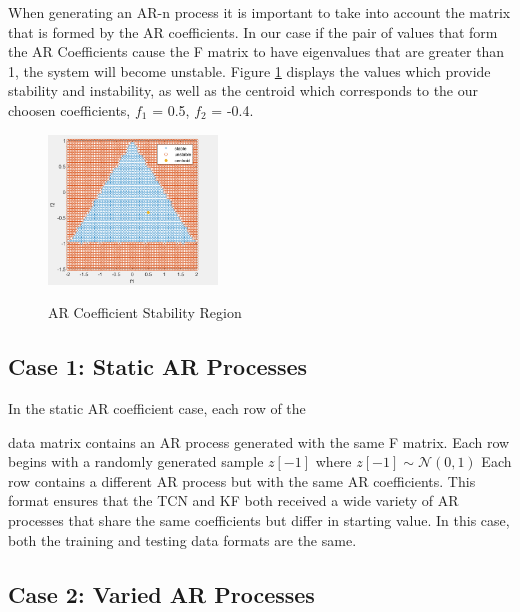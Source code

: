 \documentclass[twocolumn,letterpaper]{IEEEAerospaceCLS}  %
\begin{document}
When generating an AR-n process it is important to take into account the matrix that is formed by the AR coefficients. 
In our case if the pair of values that form the AR Coefficients
cause the F matrix to have eigenvalues that are greater than 1, the system will become unstable. Figure \ref{stabf1f2} displays the values which provide stability and instability, as well as the centroid which corresponds to the
our choosen coefficients, 
$f_1$ = 0.5, $f_2$ = -0.4.

\begin{figure}[!h]
	\centering\includegraphics[width=0.4\textwidth]{figs/stability.png}\\
	\caption{AR Coefficient Stability Region}
	\label{stabf1f2}
\end{figure}

\subsection{Case 1: Static AR Processes}

In the static AR coefficient case, each row of the 
 
data matrix contains an AR process generated with the same F matrix. Each row begins with a randomly generated sample $z[-1]$ where 
\(
z[-1] \sim \mathcal{N} \mathrm{(0,1)}
\)
Each row contains a different AR process but with the same AR coefficients. This format ensures that the TCN and KF both received a wide variety of AR processes that share the same coefficients but differ in starting value. In this case, both the training and testing data formats are the same. 

\subsection{Case 2: Varied AR Processes}
\end{document}
